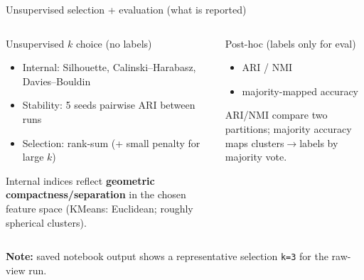 \documentclass[aspectratio=169]{beamer}
\begin{document}
\begin{frame}{Unsupervised selection + evaluation (what is reported)}
  \begin{columns}[T,onlytextwidth]
    \begin{block}{Unsupervised $k$ choice (no labels)}
      \begin{itemize}
        \item Internal: Silhouette, Calinski--Harabasz, Davies--Bouldin
        \item Stability: 5 seeds \textrightarrow pairwise ARI between runs
        \item Selection: rank-sum (+ small penalty for large $k$)
      \end{itemize}

      \vspace{0.2em}
      {\scriptsize Internal indices reflect \textbf{geometric compactness/separation} in the chosen feature space (KMeans: Euclidean; roughly spherical clusters).}
    \end{block}

    \begin{block}{Post-hoc (labels only for eval)}
      \begin{itemize}
        \item ARI / NMI
        \item majority-mapped accuracy
      \end{itemize}

      \vspace{0.2em}
      {\scriptsize ARI/NMI compare two partitions; majority accuracy maps clusters$\rightarrow$labels by majority vote.}
    \end{block}
  \end{columns}

  \vspace{0.3em}
  \footnotesize\textbf{Note:} saved notebook output shows a representative selection \texttt{k=3} for the raw-view run.
\end{frame}
\end{document}

